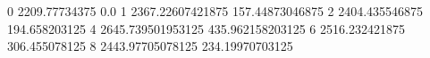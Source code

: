 0 2209.77734375 0.0
1 2367.22607421875 157.44873046875
2 2404.435546875 194.658203125
4 2645.739501953125 435.962158203125
6 2516.232421875 306.455078125
8 2443.97705078125 234.19970703125
